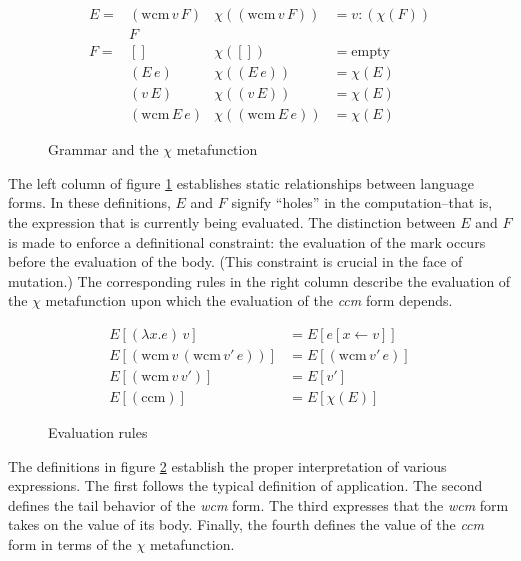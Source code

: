 \documentclass[ms]{byuprop}
\newcounter{definition}
\begin{document}
\begin{figure}
\begin{align*}
E = &(\mathrm{wcm}\,v\,F) & \chi((\mathrm{wcm}\,v\,F)) &= v : (\chi(F))\\
    &F\\
F = &[]                   & \chi([])                   &= \mathrm{empty}\\
    &(E\,e)               & \chi((E\,e))               &= \chi(E)\\
    &(v\,E)               & \chi((v\,E))               &= \chi(E)\\
    &(\mathrm{wcm}\,E\,e) & \chi((\mathrm{wcm}\,E\,e)) &= \chi(E)
\end{align*}
\caption{Grammar and the $\chi$ metafunction}
\label{grammar}
\end{figure}

The left column of figure \ref{grammar} establishes static relationships between language forms. In these definitions, $E$ and $F$ signify ``holes'' in the computation--that is, the expression that is currently being evaluated. The distinction between $E$ and $F$ is made to enforce a definitional constraint: the evaluation of the mark occurs before the evaluation of the body. (This constraint is crucial in the face of mutation.) The corresponding rules in the right column describe the evaluation of the $\chi$ metafunction upon which the evaluation of the \emph{ccm} form depends.

\begin{figure}
\begin{align*}
E[(\lambda x.e)\,v]                         &= E[e[x\leftarrow v]]\\
E[(\mathrm{wcm}\,v\,(\mathrm{wcm}\,v'\,e))] &= E[(\mathrm{wcm}\,v'\,e)]\\
E[(\mathrm{wcm}\,v\,v')]                    &= E[v']\\
E[(\mathrm{ccm})]                           &= E[\chi(E)]
\end{align*}
\caption{Evaluation rules}
\label{evaluation-rules}
\end{figure}

The definitions in figure \ref{evaluation-rules} establish the proper interpretation of various expressions. The first follows the typical definition of application. The second defines the tail behavior of the \emph{wcm} form. The third expresses that the \emph{wcm} form takes on the value of its body. Finally, the fourth defines the value of the \emph{ccm} form in terms of the $\chi$ metafunction.
\end{document}
